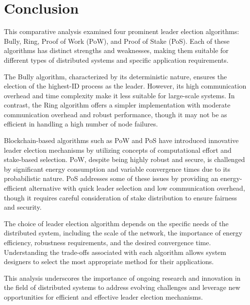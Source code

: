 \chapter{Conclusion}
This comparative analysis examined four prominent leader election algorithms: Bully, Ring, Proof of Work (PoW), and Proof of Stake (PoS). Each of these algorithms has distinct strengths and weaknesses, making them suitable for different types of distributed systems and specific application requirements.

The Bully algorithm, characterized by its deterministic nature, ensures the election of the highest-ID process as the leader. However, its high communication overhead and time complexity make it less suitable for large-scale systems. In contrast, the Ring algorithm offers a simpler implementation with moderate communication overhead and robust performance, though it may not be as efficient in handling a high number of node failures.

Blockchain-based algorithms such as PoW and PoS have introduced innovative leader election mechanisms by utilizing concepts of computational effort and stake-based selection. PoW, despite being highly robust and secure, is challenged by significant energy consumption and variable convergence times due to its probabilistic nature. PoS addresses some of these issues by providing an energy-efficient alternative with quick leader selection and low communication overhead, though it requires careful consideration of stake distribution to ensure fairness and security.

The choice of leader election algorithm depends on the specific needs of the distributed system, including the scale of the network, the importance of energy efficiency, robustness requirements, and the desired convergence time. Understanding the trade-offs associated with each algorithm allows system designers to select the most appropriate method for their applications.

This analysis underscores the importance of ongoing research and innovation in the field of distributed systems to address evolving challenges and leverage new opportunities for efficient and effective leader election mechanisms.
